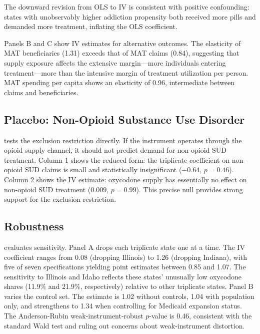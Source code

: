 \documentclass[12pt]{article}
\begin{document}
The downward revision from OLS to IV is consistent with positive confounding: states with unobservably higher addiction propensity both received more pills and demanded more treatment, inflating the OLS coefficient.

Panels B and C show IV estimates for alternative outcomes. The elasticity of MAT beneficiaries (1.31) exceeds that of MAT claims (0.84), suggesting that supply exposure affects the extensive margin---more individuals entering treatment---more than the intensive margin of treatment utilization per person. MAT spending per capita shows an elasticity of 0.96, intermediate between claims and beneficiaries.

\subsection{Placebo: Non-Opioid Substance Use Disorder}



 tests the exclusion restriction directly. If the instrument operates through the opioid supply channel, it should not predict demand for non-opioid SUD treatment. Column 1 shows the reduced form: the triplicate coefficient on non-opioid SUD claims is small and statistically insignificant ($-0.64$, $p = 0.46$). Column 2 shows the IV estimate: oxycodone supply has essentially no effect on non-opioid SUD treatment ($0.009$, $p = 0.99$). This precise null provides strong support for the exclusion restriction.

\subsection{Robustness}



 evaluates sensitivity. Panel A drops each triplicate state one at a time. The IV coefficient ranges from 0.08 (dropping Illinois) to 1.26 (dropping Indiana), with five of seven specifications yielding point estimates between 0.85 and 1.07. The sensitivity to Illinois and Idaho reflects these states' unusually low oxycodone shares (11.9\% and 21.9\%, respectively) relative to other triplicate states. Panel B varies the control set. The estimate is 1.02 without controls, 1.04 with population only, and strengthens to 1.34 when controlling for Medicaid expansion status. The Anderson-Rubin weak-instrument-robust $p$-value is 0.46, consistent with the standard Wald test and ruling out concerns about weak-instrument distortion.
\end{document}
